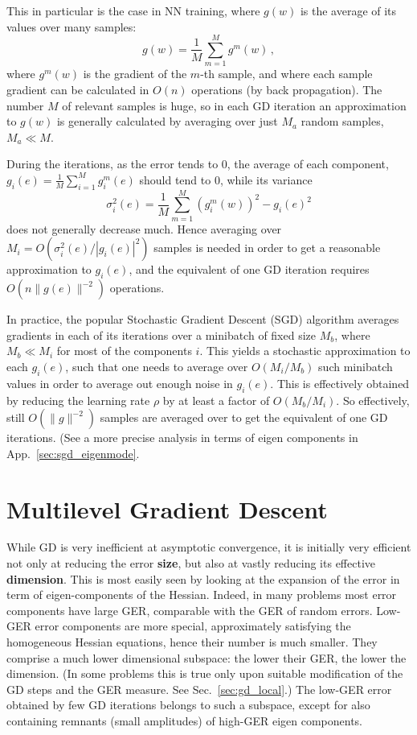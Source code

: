 \documentclass{article} %
\begin{document}
This in particular is the case in NN training, where $g(w)$ is the average of its values over many samples:
$$
	g(w) = \frac{1}{M} \sum_{m=1}^M g^m(w)\,,
$$
where $g^m(w)$ is the gradient of the $m$-th sample, and where each sample gradient can be calculated in $O(n)$ operations (by back propagation). The number $M$ of relevant samples is huge, so in each GD iteration an approximation to $g(w)$ is generally calculated by averaging over just $M_a$ random samples, $M_a \ll M$.

During the iterations, as the error tends to $0$, the average of each component, $g_i(e) = \frac{1}{M} \sum_{i=1}^M g_i^m(e)$ should tend to $0$, while its variance
$$
	\sigma_i^2(e) =  \frac{1}{M} \sum_{m=1}^M \left(g_i^m(w)\right)^2 - g_i(e)^2
$$
does not generally decrease much. Hence averaging over $M_i = O(\sigma_i^2(e) / |g_i(e)|^2)$ samples is needed in order to get a reasonable approximation to $g_i(e)$, and the equivalent of one GD iteration requires $O(n\|g(e)\|^{-2})$ operations.

In practice, the popular Stochastic Gradient Descent (SGD) algorithm averages gradients in each of its iterations over a minibatch of fixed size $M_b$, where $M_b \ll M_i$ for most of the components $i$. This yields a stochastic approximation to each $g_i(e)$, such that one needs to average over $O(M_i/M_b)$ such minibatch values in order to average out enough noise in $g_i(e)$. This is effectively obtained by reducing the learning rate $\rho$ by at least a factor of $O(M_b/M_i)$. So effectively, still $O(\|g\|^{-2})$ samples are averaged over to get the equivalent of one GD iterations. (See a more precise analysis in terms of eigen components in App.~\ref{sec:sgd_eigenmode}.


\section{Multilevel Gradient Descent}
\label{sec:mlgd}
While GD is very inefficient at asymptotic convergence, it is initially very efficient not only at reducing the error \textbf{size}, but also at vastly reducing its effective \textbf{dimension}. This is most easily seen by looking at the expansion of the error in term of eigen-components of the Hessian. Indeed, in many problems most error components have large GER, comparable with the GER of random errors. Low-GER error components are more special, approximately satisfying the homogeneous Hessian equations, hence their number is much smaller. They comprise a much lower dimensional subspace: the lower their GER, the lower the dimension. (In some problems this is true only upon suitable modification of the GD steps and the GER measure. See Sec.~\ref{sec:gd_local}.)  The low-GER error obtained by few GD iterations belongs to such a subspace, except for also containing remnants (small amplitudes) of high-GER eigen components.  
\end{document}
